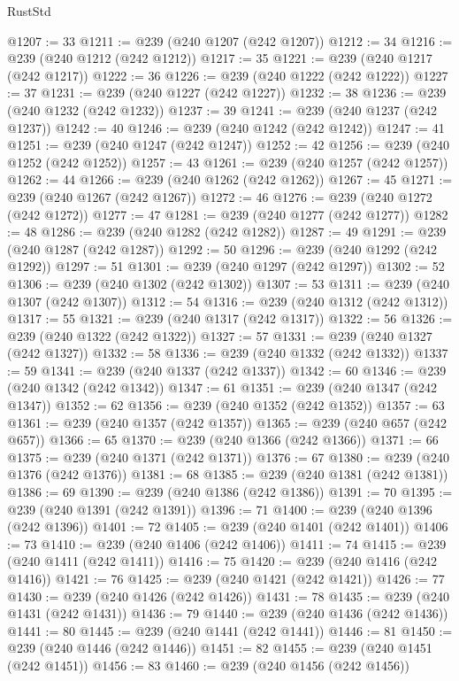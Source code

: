 \begin{lexlean}{RustStd}
\begin{coremodule}
{\begin{coremodule}
{{{{{{{{{{{{{{{{{{{{{{{{{{{{{{{{{{{{{{{{{{{{{{{{{{{{{{{{{{{{@1207 := 33
@1211 := @239 (@240 @1207 (@242 @1207))
@1212 := 34
@1216 := @239 (@240 @1212 (@242 @1212))
@1217 := 35
@1221 := @239 (@240 @1217 (@242 @1217))
@1222 := 36
@1226 := @239 (@240 @1222 (@242 @1222))
@1227 := 37
@1231 := @239 (@240 @1227 (@242 @1227))
@1232 := 38
@1236 := @239 (@240 @1232 (@242 @1232))
@1237 := 39
@1241 := @239 (@240 @1237 (@242 @1237))
@1242 := 40
@1246 := @239 (@240 @1242 (@242 @1242))
@1247 := 41
@1251 := @239 (@240 @1247 (@242 @1247))
@1252 := 42
@1256 := @239 (@240 @1252 (@242 @1252))
@1257 := 43
@1261 := @239 (@240 @1257 (@242 @1257))
@1262 := 44
@1266 := @239 (@240 @1262 (@242 @1262))
@1267 := 45
@1271 := @239 (@240 @1267 (@242 @1267))
@1272 := 46
@1276 := @239 (@240 @1272 (@242 @1272))
@1277 := 47
@1281 := @239 (@240 @1277 (@242 @1277))
@1282 := 48
@1286 := @239 (@240 @1282 (@242 @1282))
@1287 := 49
@1291 := @239 (@240 @1287 (@242 @1287))
@1292 := 50
@1296 := @239 (@240 @1292 (@242 @1292))
@1297 := 51
@1301 := @239 (@240 @1297 (@242 @1297))
@1302 := 52
@1306 := @239 (@240 @1302 (@242 @1302))
@1307 := 53
@1311 := @239 (@240 @1307 (@242 @1307))
@1312 := 54
@1316 := @239 (@240 @1312 (@242 @1312))
@1317 := 55
@1321 := @239 (@240 @1317 (@242 @1317))
@1322 := 56
@1326 := @239 (@240 @1322 (@242 @1322))
@1327 := 57
@1331 := @239 (@240 @1327 (@242 @1327))
@1332 := 58
@1336 := @239 (@240 @1332 (@242 @1332))
@1337 := 59
@1341 := @239 (@240 @1337 (@242 @1337))
@1342 := 60
@1346 := @239 (@240 @1342 (@242 @1342))
@1347 := 61
@1351 := @239 (@240 @1347 (@242 @1347))
@1352 := 62
@1356 := @239 (@240 @1352 (@242 @1352))
@1357 := 63
@1361 := @239 (@240 @1357 (@242 @1357))
@1365 := @239 (@240 @657 (@242 @657))
@1366 := 65
@1370 := @239 (@240 @1366 (@242 @1366))
@1371 := 66
@1375 := @239 (@240 @1371 (@242 @1371))
@1376 := 67
@1380 := @239 (@240 @1376 (@242 @1376))
@1381 := 68
@1385 := @239 (@240 @1381 (@242 @1381))
@1386 := 69
@1390 := @239 (@240 @1386 (@242 @1386))
@1391 := 70
@1395 := @239 (@240 @1391 (@242 @1391))
@1396 := 71
@1400 := @239 (@240 @1396 (@242 @1396))
@1401 := 72
@1405 := @239 (@240 @1401 (@242 @1401))
@1406 := 73
@1410 := @239 (@240 @1406 (@242 @1406))
@1411 := 74
@1415 := @239 (@240 @1411 (@242 @1411))
@1416 := 75
@1420 := @239 (@240 @1416 (@242 @1416))
@1421 := 76
@1425 := @239 (@240 @1421 (@242 @1421))
@1426 := 77
@1430 := @239 (@240 @1426 (@242 @1426))
@1431 := 78
@1435 := @239 (@240 @1431 (@242 @1431))
@1436 := 79
@1440 := @239 (@240 @1436 (@242 @1436))
@1441 := 80
@1445 := @239 (@240 @1441 (@242 @1441))
@1446 := 81
@1450 := @239 (@240 @1446 (@242 @1446))
@1451 := 82
@1455 := @239 (@240 @1451 (@242 @1451))
@1456 := 83
@1460 := @239 (@240 @1456 (@242 @1456))
}}}}}}}}}}}}}}}}}}}}}}}}}}}}}}}}}}}}}}}}}}}}}}}}}}}}}}}}}}}}
\end{coremodule}}
\end{coremodule}
\end{lexlean}
